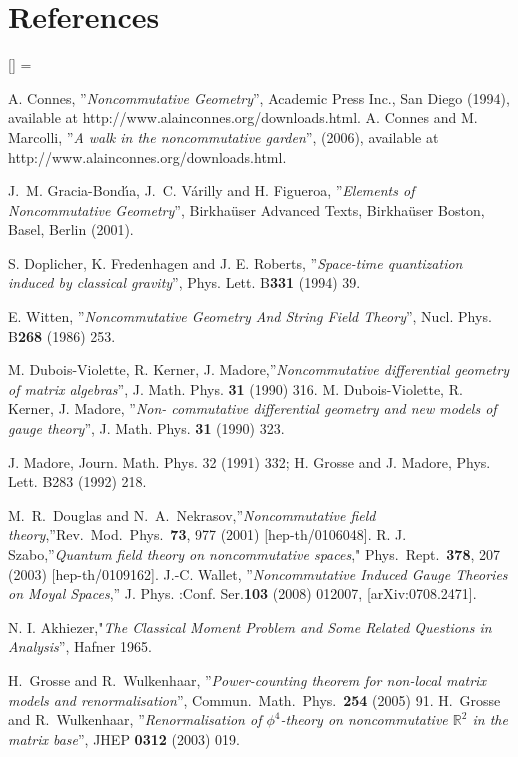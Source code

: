 \documentclass[a4paper]{jpconf}
\numberwithin{equation}{section}
\theoremstyle{nonumberplain}
\renewenvironment{thebibliography}[1]{%
\section*{References}%
\frenchspacing\small%
\begin{list}{[\arabic{enumi}]}%
{%
\usecounter{enumi}\parsep=2pt\topsep 0pt%
\settowidth{\labelwidth}{[#1]}%
\leftmargin=\labelwidth\advance\leftmargin\labelsep%
\rightmargin=0pt\itemsep=1pt\sloppy%
}%
}{\end{list}}
\begin{document}

\begin{thebibliography}{50} 

 A. Connes, ''{\it{Noncommutative Geometry}}'', Academic Press Inc., San Diego (1994), available at
http://www.alainconnes.org/downloads.html. A. Connes and M. Marcolli, ''{\it{A walk in the noncommutative garden}}'', (2006), available at http://www.alainconnes.org/downloads.html.

J.~M. Gracia-Bond{\'\i}a, J.~C. V{\'a}rilly and H. Figueroa, ''{\it{Elements of Noncommutative Geometry}}'', Birkha\"user Advanced Texts, Birkha\"user Boston, Basel, Berlin (2001).

 S. Doplicher, K. Fredenhagen and J. E. Roberts, ''{\it{Space-time quantization induced by classical gravity}}'', Phys. Lett. B{\bf{331}} (1994) 39.

 E. Witten, ''{\it{Noncommutative Geometry And String Field Theory}}'', Nucl. Phys. B{\bf{268}} (1986) 253.

 M. Dubois-Violette, R. Kerner, J. Madore,''{\it{Noncommutative differential geometry of matrix
algebras}}'', J. Math. Phys. {\bf{31}} (1990) 316. M. Dubois-Violette, R. Kerner, J. Madore, ''{\it{Non-
commutative differential geometry and new models of gauge theory}}'', J. Math. Phys. {\bf{31}} (1990)
323.

 J. Madore, Journ. Math. Phys. 32 (1991) 332; H. Grosse and J. Madore, Phys. Lett. B283
(1992) 218.

M.~R.~Douglas and N.~A.~Nekrasov,''{\it{Noncommutative field theory}},''Rev.\ Mod.\ Phys.\  {\bf 73}, 977 (2001) [hep-th/0106048]. R. J. Szabo,''{\it{Quantum field theory on noncommutative spaces}}," Phys.\ Rept.\  {\bf 378}, 207 (2003) [hep-th/0109162]. 
J.-C. Wallet, ''{\it{Noncommutative Induced 
Gauge Theories on Moyal Spaces}},'' J. Phys. :Conf. Ser.{\bf{103}} (2008) 012007, [arXiv:0708.2471]. 

 N. I. Akhiezer,"{\it{The Classical Moment Problem and Some Related Questions in Analysis}}'', Hafner 1965.

H.~Grosse and R.~Wulkenhaar, ''{\it{Power-counting theorem for non-local matrix models and renormalisation}}'', Commun.\ Math.\ Phys.\  {\bf 254} (2005) 91. H.~Grosse and R.~Wulkenhaar, ''{\it{Renormalisation of $\phi^4$-theory on noncommutative $\mathbb{R}^2$ in the matrix base}}'', JHEP {\bf 0312} (2003) 019. 


\end{thebibliography}
\end{document}
